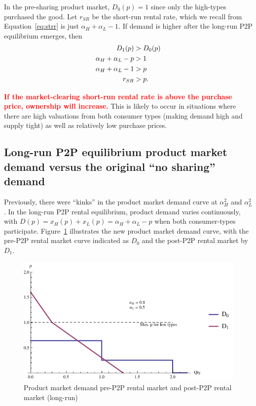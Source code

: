 \documentclass[11pt]{article}
\newcommand{\important}[1]{\textcolor{red}{\textbf{#1}}}
\newcommand{\important}[1]{#1}
\begin{document}
In the pre-sharing product market, $D_0(p) = 1$ since only the high-types purchased the good. 
Let $r_{SR}$ be the short-run rental rate, which we recall from Equation~\ref{eq:strr} is just $\alpha_H + \alpha_L - 1$. 
If demand is higher after the long-run P2P equilibrium emerges, then  
\begin{align} 
D_{1}(p) & > D_{0}(p) \notag \\
\alpha_H + \alpha_L - p &> 1 \notag \\ 
\alpha_H + \alpha_L - 1 &> p \notag \\ 
r_{SR} &>  p. 
\end{align} 

\important{If the market-clearing short-run rental rate is above the purchase price, ownership will increase.}
This is likely to occur in situations where there are high valuations from both consumer types (making demand high and supply tight) as well as relatively low purchase prices. 

\subsection{Long-run P2P equilibrium product market demand versus the original ``no sharing'' demand} 
Previously, there were ``kinks'' in the product market demand curve at $\alpha_H^2$ and $\alpha_L^2$. 
In the long-run P2P rental equilibrium, product demand varies continuously, with $D(p) = x_H(p) + x_L(p) = \alpha_H + \alpha_L - p$ when both consumer-types participate. 
Figure~\ref{fig:demand} illustrates the new product market demand curve, with the pre-P2P rental market curve indicated as $D_0$ and the post-P2P rental market by $D_1$. 

\begin{figure}
\caption{Product market demand pre-P2P rental market and post-P2P rental market (long-run)}
\label{fig:demand} 
\centering
\includegraphics[scale = 1]{./diagrams/p2plr_demand.pdf}
\end{figure} 
\end{document}
